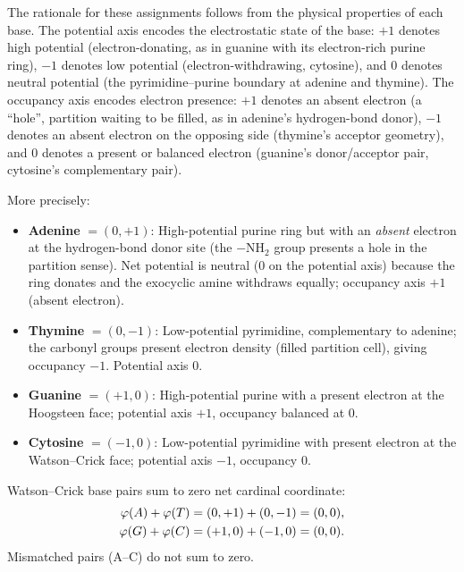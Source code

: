 The rationale for these assignments follows from the physical properties of
each base. The potential axis encodes the electrostatic state of the base:
$+1$ denotes high potential (electron-donating, as in guanine with its
electron-rich purine ring), $-1$ denotes low potential (electron-withdrawing,
cytosine), and $0$ denotes neutral potential (the pyrimidine--purine boundary
at adenine and thymine). The occupancy axis encodes electron presence: $+1$
denotes an absent electron (a ``hole'', partition waiting to be filled, as in
adenine's hydrogen-bond donor), $-1$ denotes an absent electron on the
opposing side (thymine's acceptor geometry), and $0$ denotes a present or
balanced electron (guanine's donor/acceptor pair, cytosine's complementary
pair).

More precisely:
\begin{itemize}
  \item \textbf{Adenine} $= (0, +1)$: High-potential purine ring but
        with an \emph{absent} electron at the hydrogen-bond donor site
        (the $-\mathrm{NH}_2$ group presents a hole in the partition sense).
        Net potential is neutral ($0$ on the potential axis) because the
        ring donates and the exocyclic amine withdraws equally; occupancy
        axis $+1$ (absent electron).
  \item \textbf{Thymine} $= (0, -1)$: Low-potential pyrimidine, complementary
        to adenine; the carbonyl groups present electron density (filled
        partition cell), giving occupancy $-1$. Potential axis $0$.
  \item \textbf{Guanine} $= (+1, 0)$: High-potential purine with a
        present electron at the Hoogsteen face; potential axis $+1$,
        occupancy balanced at $0$.
  \item \textbf{Cytosine} $= (-1, 0)$: Low-potential pyrimidine with
        present electron at the Watson--Crick face; potential axis $-1$,
        occupancy $0$.
\end{itemize}

\begin{theorem}
\label{thm:charge_balance}
Watson--Crick base pairs sum to zero net cardinal coordinate:
\begin{align}
  \varphi(A) + \varphi(T) &= (0,+1) + (0,-1) = (0,0), \label{eq:AT_balance}\\
  \varphi(G) + \varphi(C) &= (+1,0) + (-1,0) = (0,0). \label{eq:GC_balance}
\end{align}
Mismatched pairs (\eg A--C) do not sum to zero.
\end{theorem}

